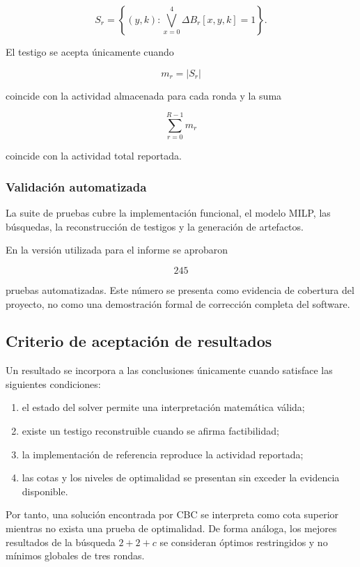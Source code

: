 \[
S_r
=
\left\{
(y,k):
\bigvee_{x=0}^{4}
\Delta B_r[x,y,k]=1
\right\}.
\]

El testigo se acepta únicamente cuando

\[
m_r=|S_r|
\]

coincide con la actividad almacenada para cada ronda y la suma

\[
\sum_{r=0}^{R-1}m_r
\]

coincide con la actividad total reportada.


\subsubsection{Validación automatizada}

La suite de pruebas cubre la implementación funcional, el modelo MILP,
las búsquedas, la reconstrucción de testigos y la generación de
artefactos.

En la versión utilizada para el informe se aprobaron

\[
245
\]

pruebas automatizadas. Este número se presenta como evidencia de cobertura
del proyecto, no como una demostración formal de corrección completa del
software.


\subsection{Criterio de aceptación de resultados}
\label{subsec:criterio_aceptacion_resultados}

Un resultado se incorpora a las conclusiones únicamente cuando satisface
las siguientes condiciones:

\begin{enumerate}
    \item el estado del solver permite una interpretación matemática
    válida;

    \item existe un testigo reconstruible cuando se afirma factibilidad;

    \item la implementación de referencia reproduce la actividad
    reportada;

    \item las cotas y los niveles de optimalidad se presentan sin exceder
    la evidencia disponible.
\end{enumerate}

Por tanto, una solución encontrada por CBC se interpreta como cota
superior mientras no exista una prueba de optimalidad. De forma análoga,
los mejores resultados de la búsqueda $2+2+c$ se consideran óptimos
restringidos y no mínimos globales de tres rondas.
